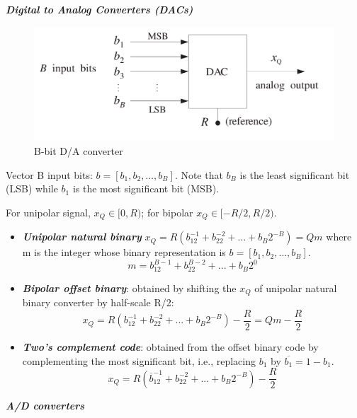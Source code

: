 \documentclass[11pt, a4paper]{article}
\begin{document}
\textit{\textbf{Digital to Analog Converters (DACs)}}

\begin{figure}[h!]
    \centering
    \includegraphics[width=0.5\linewidth]{img/20.png}
    \caption{B-bit D/A converter}
\end{figure}
Vector B input bits: $b=[b_1, b_2,…,b_B]$. Note that $b_B$ is the least significant bit (LSB) while $b_1$ is the most significant bit (MSB).

For unipolar signal, $x_Q \in [0, R)$; for bipolar $x_Q \in [-R/2, R/2)$.
\begin{itemize}
    \item \textbf{\textit{Unipolar natural binary}} $x_Q=R(b_12^{-1}+b_22^{-2}+...+b_B2^{-B})=Qm$ where m is the integer whose binary representation is $b=[b_1, b_2,…,b_B]$.
    \begin{equation*}
        m = b_12^{B-1}+b_22^{B-2}+...+b_B2^{0}
    \end{equation*}
    \item \textbf{\textit{Bipolar offset binary}}: obtained by shifting the $x_Q$ of unipolar natural binary converter by half-scale R/2:
    \begin{equation*}
        x_Q = R(b_12^{-1}+b_22^{-2}+...+b_B2^{-B})-\dfrac{R}{2}=Qm-\dfrac{R}{2}
    \end{equation*}
    \item \textbf{\textit{Two’s complement code}}: obtained from the offset binary code by complementing the most significant bit, i.e., replacing $b_1$ by $\overline{b_1}=1-b_1$.
    \begin{equation*}
         x_Q = R(\overline{b}_12^{-1}+b_22^{-2}+...+b_B2^{-B})-\dfrac{R}{2}
    \end{equation*}
\end{itemize}

\textit{\textbf{A/D converters}}
\end{document}
